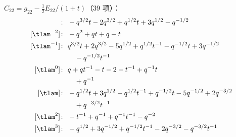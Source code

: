$C_{22} = g_{22} - \tfrac12 E_{22}/(1+t)$（39 項）：
\begin{align*}
[\tlam^{-3}]\colon\ & -q^{3/2} t -2 q^{3/2} +q^{1/2} t +3 q^{1/2} -q^{-1/2} \\
[\tlam^{-2}]\colon\ & -q^{2} +q t +q -t \\
[\tlam^{-1}]\colon\ & q^{3/2} t +2 q^{3/2} -5 q^{1/2} +q^{1/2} t^{-1} -q^{-1/2} t +3 q^{-1/2} \\
& \quad -q^{-1/2} t^{-1} \\
[\tlam^{0}]\colon\ & q +q t^{-1} -t -2 -t^{-1} +q^{-1} t \\
& \quad +q^{-1} \\
[\tlam]\colon\ & -q^{1/2} t +3 q^{1/2} -q^{1/2} t^{-1} +q^{-1/2} t -5 q^{-1/2} +2 q^{-3/2} \\
& \quad +q^{-3/2} t^{-1} \\
[\tlam^{2}]\colon\ & -t^{-1} +q^{-1} +q^{-1} t^{-1} -q^{-2} \\
[\tlam^{3}]\colon\ & -q^{1/2} +3 q^{-1/2} +q^{-1/2} t^{-1} -2 q^{-3/2} -q^{-3/2} t^{-1}
\end{align*}
